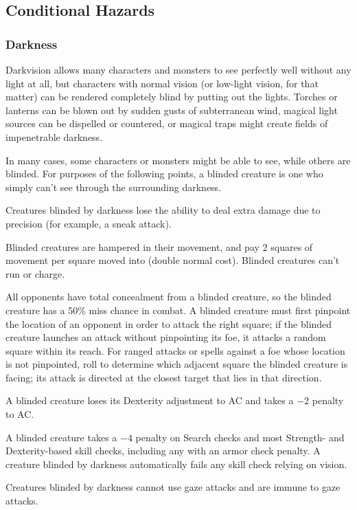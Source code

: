 \subsection{Conditional Hazards}
\subsubsection{Darkness}
Darkvision allows many characters and monsters to see perfectly well without any light at all, but characters with normal vision (or low-light vision, for that matter) can be rendered completely blind by putting out the lights. Torches or lanterns can be blown out by sudden gusts of subterranean wind, magical light sources can be dispelled or countered, or magical traps might create fields of impenetrable darkness.

In many cases, some characters or monsters might be able to see, while others are blinded. For purposes of the following points, a blinded creature is one who simply can't see through the surrounding darkness.
\begin{itemize*}
\item Creatures blinded by darkness lose the ability to deal extra damage due to precision (for example, a sneak attack).
\item Blinded creatures are hampered in their movement, and pay 2 squares of movement per square moved into (double normal cost). Blinded creatures can't run or charge.
\item All opponents have total concealment from a blinded creature, so the blinded creature has a 50\% miss chance in combat. A blinded creature must first pinpoint the location of an opponent in order to attack the right square; if the blinded creature launches an attack without pinpointing its foe, it attacks a random square within its reach. For ranged attacks or spells against a foe whose location is not pinpointed, roll to determine which adjacent square the blinded creature is facing; its attack is directed at the closest target that lies in that direction.
\item A blinded creature loses its Dexterity adjustment to AC and takes a $-2$ penalty to AC.
\item A blinded creature takes a $-4$ penalty on Search checks and most Strength- and Dexterity-based skill checks, including any with an armor check penalty. A creature blinded by darkness automatically fails any skill check relying on vision.
\item Creatures blinded by darkness cannot use gaze attacks and are immune to gaze attacks.
\end{itemize*}

